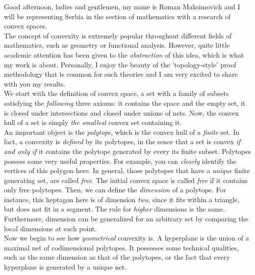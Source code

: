 \documentclass[12pt]{article}
\begin{document}

Good afternoon, ladies and gentlemen, my name is Roman Maksimovich and I will be representing Serbia in the section of mathematics with a research of convex spaces.\\

The concept of convexity is extremely popular throughout different fields of mathematics, such as geometry or functional analysis. However, quite little academic attention has been given to the \textit{abstraction} of this idea, which is what my work is about. Personally, I enjoy the beauty of the 'topology-style' proof methodology that is common for such theories and I am very excited to share with you my results.\\

We start with the definition of convex space, a set with a family of subsets satisfying the \textit{following} three axioms: it contains the space and the empty set, it is closed under intersections and closed under unions of nets. Now, the convex hull of a set is simply \textit{the smallest} convex set containing it.\\

An important object is the \textit{polytope}, which is the convex hull of a \textit{finite} set. In fact, a convexity is \textit{defined} by its polytopes, in the sence that a set is convex \textit{if and only if} it contains the polytope generated by every its finite subset. Polytopes possess some very useful properties. For example, you can \textit{clearly} identify the vertices of this polygon here. In general, those polytopes that have a \textit{unique} finite generating set, are called \textit{free}. The initial convex space is called \textit{free} if it contains only free polytopes. Then, we can define the \textit{dimension} of a polytope. For instance, this heptagon here is of dimension \textit{two}, since it fits within a triangle, but does not fit in a segment. The rule for \textit{higher} dimensions is the same. Furthermore, dimension can be generalized for an arbitrary set by comparing the local dimensions at each point.\\

Now we begin to see how \textit{geometrical} convexity is. A hyperplane is the union of a maximal net of codimensional polytopes. It possesses some technical qualities, such as the same dimension as that of the polytopes, or the fact that every hyperplane is generated by a unique net.\\
\end{document}
